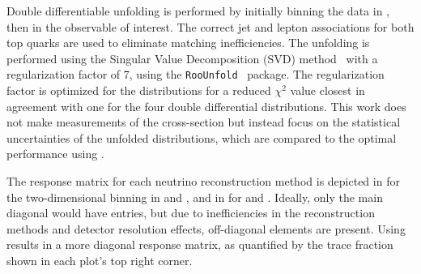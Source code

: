 Double differentiable unfolding is performed by initially binning the data in \mttbar, then in the observable of interest.
The correct jet and lepton associations for both top quarks are used to eliminate matching inefficiencies.
The unfolding is performed using the Singular Value Decomposition (SVD) method~\cite{SVDApproachData} with a regularization factor of 7, using the \texttt{RooUnfold}~\cite{ComparisonUnfoldingMethods} package.
The regularization factor is optimized for the \vtruth distributions for a reduced $\chi^2$ value closest in agreement with one for the four double differential distributions.
This work does not make measurements of the cross-section but instead focus on the statistical uncertainties of the unfolded distributions, which are compared to the optimal performance using \vtruth.

\begin{table}[htbp]
    \centering
    \caption{Kinematic observables of the reconstructed \ttbar system studied for an unfolding analysis in dilepton events and their bin edges.}
    \label{tab:diff_observables}
\end{table}

The response matrix for each neutrino reconstruction method is depicted in  for the two-dimensional binning in \mttbar and \dphill, and in  for \mttbar and \pttop.
Ideally, only the main diagonal would have entries, but due to inefficiencies in the reconstruction methods and detector resolution effects, off-diagonal elements are present.
Using \vvflows results in a more diagonal response matrix, as quantified by the trace fraction shown in each plot's top right corner.


